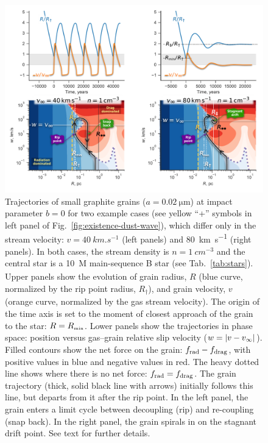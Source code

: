 \begin{figure}
  \centering
  \includegraphics[width=\linewidth]{figs/dust-wave-phase-trajectories-annotate}
  \caption{Trajectories of small graphite grains
    (\(a = \SI{0.02}{\um}\)) at impact parameter \(b = 0\) for two
    example cases (see yellow ``+'' symbols in left panel of
    Fig.~\ref{fig:existence-dust-wave}), which differ only in the
    stream velocity: \(v = \SI{40}{km.s^{-1}}\) (left panels) and
    \SI{80}{km.s^{-1}} (right panels).  In both cases, the stream
    density is \(n = \SI{1}{cm^{-3}}\) and the central star is a
    \SI{10}{M_\odot} main-sequence B star (see Tab.~\ref{tab:stars}).
    Upper panels show the evolution of grain radius, \(R\) (blue
    curve, normalized by the rip point radius, \(R_\dag\)), and grain
    velocity, \(v\) (orange curve, normalized by the gas stream
    velocity).  The origin of the time axis is set to the moment of
    closest approach of the grain to the star: \(R = R_{\scriptscriptstyle\text{min}}\).  Lower
    panels show the trajectories in phase space: position versus
    gas--grain relative slip velocity (\(w = \lvert v - v_\infty\rvert\)).  Filled
    contours show the net force on the grain: \(f_{\text{rad}} - f_{\text{drag}}\), with
    positive values in blue and negative values in red.  The heavy
    dotted line shows where there is no net force: \(f_{\text{rad}} = f_{\text{drag}}\).
    The grain trajectory (thick, solid black line with arrows)
    initially follows this line, but departs from it after the rip
    point. In the left panel, the grain enters a limit cycle between
    decoupling (rip) and re-coupling (snap back).  In the right panel,
    the grain spirals in on the stagnant drift point.  See text for
    further details.}
    \label{fig:phase-space-trajectories}
\end{figure}

